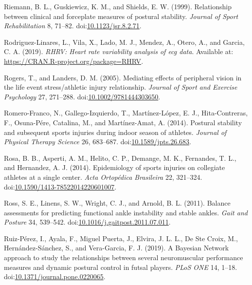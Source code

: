 \documentclass[
  english,
  man,floatsintext]{apa6}
\newlength{\cslhangindent}
\newenvironment{cslreferences}%
  {\setlength{\parindent}{0pt}%
  \everypar{\setlength{\hangindent}{\cslhangindent}}\ignorespaces}%
  {\par}
\begin{document}
\begin{cslreferences}
\leavevmode\hypertarget{ref-Riemann1999d}{}%
Riemann, B. L., Guskiewicz, K. M., and Shields, E. W. (1999). Relationship between clinical and forceplate measures of postural stability. \emph{Journal of Sport Rehabilitation} 8, 71--82. doi:\href{https://doi.org/10.1123/jsr.8.2.71}{10.1123/jsr.8.2.71}.

\leavevmode\hypertarget{ref-Rodriguez-Linares2017}{}%
Rodriguez-Linares, L., Vila, X., Lado, M. J., Mendez, A., Otero, A., and Garcia, C. A. (2019). \emph{RHRV: Heart rate variability analysis of ecg data}. Available at: \url{https://CRAN.R-project.org/package=RHRV}.

\leavevmode\hypertarget{ref-Rogers2005}{}%
Rogers, T., and Landers, D. M. (2005). Mediating effects of peripheral vision in the life event stress/athletic injury relationship. \emph{Journal of Sport and Exercise Psychology} 27, 271--288. doi:\href{https://doi.org/10.1002/9781444303650}{10.1002/9781444303650}.

\leavevmode\hypertarget{ref-Romero-Franco2014}{}%
Romero-Franco, N., Gallego-Izquierdo, T., Martínez-López, E. J., Hita-Contreras, F., Osuna-Pére, Catalina, M., and Martínez-Amat, A. (2014). Postural stability and subsequent sports injuries during indoor season of athletes. \emph{Journal of Physical Therapy Science} 26, 683--687. doi:\href{https://doi.org/10.1589/jpts.26.683}{10.1589/jpts.26.683}.

\leavevmode\hypertarget{ref-Rosa2014}{}%
Rosa, B. B., Asperti, A. M., Helito, C. P., Demange, M. K., Fernandes, T. L., and Hernandez, A. J. (2014). Epidemiology of sports injuries on collegiate athletes at a single center. \emph{Acta Ortopédica Brasileira} 22, 321--324. doi:\href{https://doi.org/10.1590/1413-78522014220601007}{10.1590/1413-78522014220601007}.

\leavevmode\hypertarget{ref-Ross2011}{}%
Ross, S. E., Linens, S. W., Wright, C. J., and Arnold, B. L. (2011). Balance assessments for predicting functional ankle instability and stable ankles. \emph{Gait and Posture} 34, 539--542. doi:\href{https://doi.org/10.1016/j.gaitpost.2011.07.011}{10.1016/j.gaitpost.2011.07.011}.

\leavevmode\hypertarget{ref-Ruiz-Perez2019}{}%
Ruiz-Pérez, I., Ayala, F., Miguel Puerta, J., Elvira, J. L. L., De Ste Croix, M., Hernández-Sánchez, S., and Vera-Garcia, F. J. (2019). A Bayesian Network approach to study the relationships between several neuromuscular performance measures and dynamic postural control in futsal players. \emph{PLoS ONE} 14, 1--18. doi:\href{https://doi.org/10.1371/journal.pone.0220065}{10.1371/journal.pone.0220065}.


\end{cslreferences}
\end{document}
